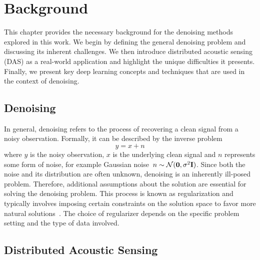\chapter{Background}\label{ch:background}

This chapter provides the necessary background for the denoising methods explored in this work.
We begin by defining the general denoising problem and discussing its inherent challenges.
We then introduce distributed acoustic sensing (DAS) as a real-world application and highlight the unique difficulties 
it presents.
Finally, we present key deep learning concepts and techniques that are used in the context of denoising.

\section{Denoising}

In general, denoising refers to the process of recovering a clean signal from a noisy observation.
Formally, it can be described by the inverse problem 
\begin{equation}
    y = x + n
\end{equation}
where $y$ is the noisy observation, $x$ is the underlying clean signal and $n$ represents some form of noise, for
example Gaussian noise~$n \sim \mathcal{N}(\mathbf{0},\sigma^2\mathbf{I})$.
Since both the noise and its distribution are often unknown, denoising is an inherently ill-posed problem.
Therefore, additional assumptions about the solution are essential for solving the denoising problem. 
This process is known as regularization and typically involves imposing certain constraints on the solution space to 
favor more natural solutions~\cite{XXX}. 
The choice of regularizer depends on the specific problem setting and the type of data involved.

\section{Distributed Acoustic Sensing}

